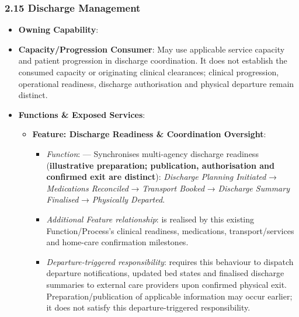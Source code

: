 \par\smallskip
{}\label{rad:hso:274}
\subsubsection*{2.15 Discharge Management}
\label{rad:hso:275}

\begin{itemize}

\item 
\textbf{Owning Capability}: \texttt{}



\item 
\textbf{Capacity/\allowbreak{}Progression Consumer}: May use applicable service capacity and patient progression in discharge coordination. It does not establish the consumed capacity or originating clinical clearances; clinical progression, operational readiness, discharge authorisation and physical departure remain distinct.



\item 
\textbf{Functions \& Exposed Services}:


\begin{itemize}

\item 
\textbf{Feature: Discharge Readiness \& Coordination Oversight}:


\begin{itemize}

\item 
\emph{Function}: \texttt{} — Synchronises multi-agency discharge readiness (\textbf{illustrative preparation; publication, authorisation and confirmed exit are distinct}): \emph{Discharge Planning Initiated} → \emph{Medications Reconciled} → \emph{Transport Booked} → \emph{Discharge Summary Finalised} → \emph{Physically Departed}.



\item 
\emph{Additional Feature relationship}: \texttt{} is realised by this existing Function/\allowbreak{}Process's clinical readiness, medications, transport/\allowbreak{}services and home-care confirmation milestones.



\item 
\emph{Departure-triggered responsibility}: \texttt{} requires this behaviour to dispatch departure notifications, updated bed states and finalised discharge summaries to external care providers upon confirmed physical exit. Preparation/\allowbreak{}publication of applicable information may occur earlier; it does not satisfy this departure-triggered responsibility.




\end{itemize}
\end{itemize}
\end{itemize}
